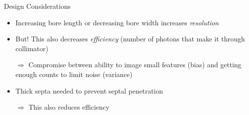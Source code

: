 \begin{frame}[c]{Design Considerations}

    \begin{itemize}
        \setlength\itemsep{0.2cm}
        \item Increasing bore length or decreasing bore width increases \emph{resolution}
        \item 	But! This also decreases \emph{efficiency} (number of photons that make it through collimator)
        \item[$\Rightarrow$] Compromise between ability to image small features (bias) and getting enough counts to limit noise (variance)
    \end{itemize}

    \vspace{0.7cm}
    \begin{itemize}
        \setlength\itemsep{0.2cm}
        \item Thick septa needed to prevent septal penetration
        \item[$\Rightarrow$] This also reduces efficiency
    \end{itemize}
\end{frame}


